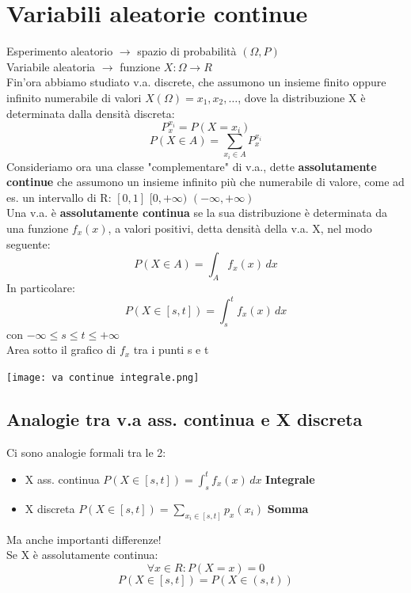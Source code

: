 \documentclass[12pt, a4paper, openany]{book}
\begin{document}
\section{Variabili aleatorie continue}
Esperimento aleatorio $\to$ spazio di probabilità $(\Omega, P)$
\\ Variabile aleatoria $\to$ funzione $X:\Omega \to R$
\\Fin'ora abbiamo studiato v.a. discrete, che assumono un insieme finito oppure
infinito numerabile di valori $X(\Omega) = {x_1, x_2, \dots}$, dove la distribuzione
X è determinata dalla densità discreta:
\begin{equation*}
    P_x^{x_i} = P(X=x_i)
\end{equation*}
\begin{equation}
    P(X \in A) = \sum_{x_i \in A}P_x^{x_i}  
\end{equation}
Consideriamo ora una classe "complementare" di v.a., dette \textbf{assolutamente continue}
che assumono un insieme infinito più che numerabile di valore, come ad es. un intervallo
di R: $[0, 1]$ $[0, +\infty)$ $(-\infty, +\infty)$
\\ Una v.a. è \textbf{assolutamente continua} se la sua distribuzione è determinata
da una funzione $f_x(x)$, a valori positivi, detta densità della v.a. X, nel modo
seguente:
\begin{equation*}
    P(X \in A) = \int_{A}f_x (x) \,dx 
\end{equation*}
In particolare:
\begin{equation*}
    P(X\in[s,t]) = \int_{s}^{t} f_x (x)\,dx 
\end{equation*}
con $-\infty \leq s \leq t \leq +\infty$
\\Area sotto il grafico di $f_x$ tra i punti s e t
\begin{center}
    \texttt{[image: va continue integrale.png]}
\end{center}
\subsection*{Analogie tra v.a ass. continua e X discreta}
Ci sono analogie formali tra le 2: \begin{itemize}
    \item X ass. continua $P(X \in [s, t]) = \int_{s}^{t} f_x (x) \,dx$ \textbf{Integrale}
    \item X discreta $P(X \in [s, t]) = \sum_{x_i \in [s,t]}p_x (x_i)$ \textbf{Somma}
\end{itemize}
Ma anche importanti differenze!
\\ Se X è assolutamente continua:
\begin{equation*}
    \forall x \in R: P(X=x) = 0
\end{equation*}
\begin{equation*}
    P(X \in [s,t]) = P(X \in (s, t))
\end{equation*}
\end{document}
